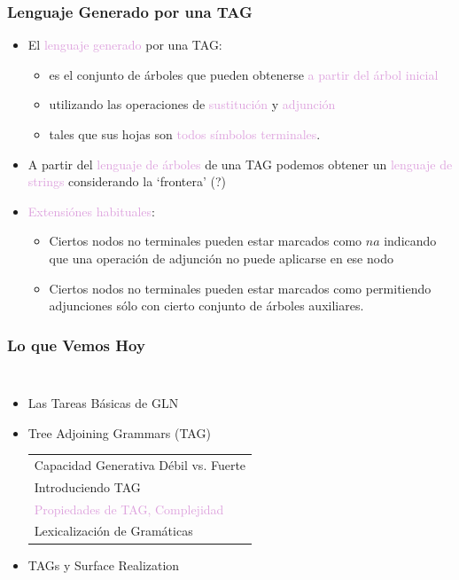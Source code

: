 \documentclass[compress,color=usenames]{beamer}
\newcommand{\mH}[1]{\textcolor{Plum}{#1}}
\begin{document}
\begin{frame}
\frametitle{Lenguaje Generado por una TAG}

\begin{itemize}
\item El \mH{lenguaje generado} por una TAG:
\begin{itemize}
\item es el conjunto de \'arboles que pueden obtenerse \mH{a partir del \'arbol inicial}
\item utilizando las operaciones de \mH{sustituci\'on} y  \mH{adjunci\'on}
\item tales que sus hojas son \mH{todos s\'imbolos terminales}. 
\end{itemize} 

\item A partir del \mH{lenguaje de \'arboles} de una TAG podemos obtener un 
\mH{lenguaje de strings} considerando la `frontera' (?)  

\item \mH{Extensi\'ones habituales}: 
\begin{itemize}
\item Ciertos nodos no terminales pueden estar marcados como $na$ indicando 
que una operaci\'on de adjunci\'on no puede aplicarse en ese nodo
\item Ciertos nodos no terminales pueden estar marcados como permitiendo adjunciones 
s\'olo con cierto conjunto de \'arboles auxiliares.
\end{itemize}
\end{itemize}
\end{frame}

\begin{frame}
\frametitle{Lo que Vemos Hoy}

\begin{columns}
\begin{itemize}
\item Las Tareas B\'asicas de GLN
\item Tree Adjoining Grammars (TAG)
\begin{tabular}{|l}
Capacidad Generativa D\'ebil vs. Fuerte\\
Introduciendo TAG\\
\mH{Propiedades de TAG, Complejidad}\\
Lexicalizaci\'on de Gram\'aticas
\end{tabular}

\item TAGs y Surface Realization
\end{itemize}
\end{columns}
\end{frame}
\end{document}
